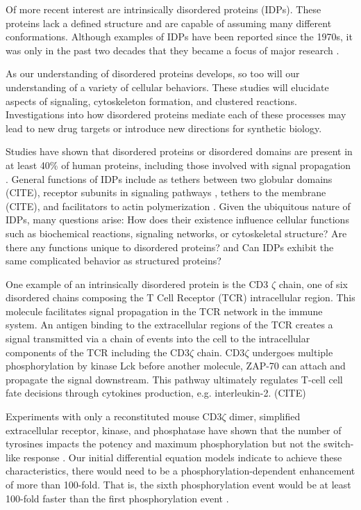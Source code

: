 \documentclass[../AdvancementSummary.tex]{subfiles}
\begin{document}
Of more recent interest are intrinsically disordered proteins (IDPs). These proteins lack a defined structure and are capable of assuming many different conformations. Although examples of IDPs have been reported since the 1970s, it was only in the past two decades that they became a focus of major research \cite{Dunker2008}. 

As our understanding of disordered proteins develops, so too will our understanding of a variety of cellular behaviors. These studies will elucidate aspects of signaling, cytoskeleton formation, and clustered reactions. Investigations into how disordered proteins mediate each of these processes may lead to new drug targets or introduce new directions for synthetic biology.

Studies have shown that disordered proteins or disordered domains are present in at least 40\% of human proteins, including those involved with signal propagation \cite{Tompa2012}. General functions of IDPs include as tethers between two globular domains (CITE), receptor subunits in signaling pathways \cite{Duchardt2007}, tethers to the membrane (CITE), and facilitators to actin polymerization \cite{Kovar2004, Romero2004}. Given the ubiquitous nature of IDPs, many questions arise: How does their existence influence cellular functions such as biochemical reactions, signaling networks, or cytoskeletal structure?  Are there any functions unique to disordered proteins? and Can IDPs exhibit the same complicated behavior as structured proteins?

One example of an intrinsically disordered protein is the CD3 $\zeta$ chain, one of six disordered chains composing the T Cell Receptor (TCR) intracellular region. This molecule facilitates signal propagation in the TCR network in the immune system. An antigen binding to the extracellular regions of the TCR creates a signal transmitted via a chain of events into the cell to the intracellular components of the TCR including the CD3$\zeta$ chain. CD3$\zeta$ undergoes multiple phosphorylation by kinase Lck before another molecule, ZAP-70 can attach and propagate the signal downstream. This pathway ultimately regulates T-cell cell fate decisions through cytokines production, e.g. interleukin-2. (CITE)


Experiments with only a reconstituted mouse CD3$\zeta$ dimer, simplified extracellular receptor, kinase, and phosphatase have shown that the number of tyrosines impacts the potency and maximum phosphorylation but not the switch-like response \cite{Mukhopadhyay2016}. Our initial differential equation models indicate to achieve these characteristics, there would need to be a phosphorylation-dependent enhancement of more than 100-fold. That is, the sixth phosphorylation event would be at least 100-fold faster than the first phosphorylation event \cite{Mukhopadhyay2016}. 
\end{document}
